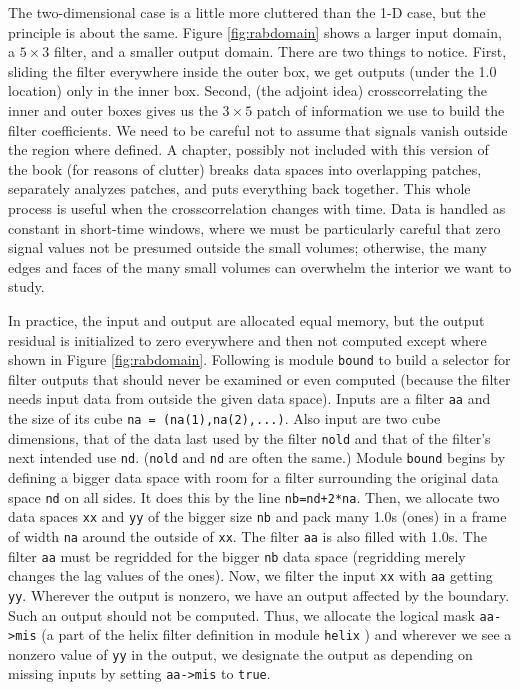 \par
The two-dimensional case is a little more cluttered than the 1-D case,
but the principle is about the same.
Figure \ref{fig:rabdomain} shows a larger input domain,
a $5\times 3$ filter, and a smaller output domain.
There are two things to notice.
First, sliding the filter everywhere inside the outer box,
we get outputs (under the 1.0 location) only in the inner box.
Second, (the adjoint idea) crosscorrelating the inner and outer boxes gives
us the $3\times 5$ patch of information
we use to build the filter coefficients.
We need to be careful not to assume
that signals vanish outside the region where defined.
A chapter, possibly not included with this version of the book
(for reasons of clutter)
breaks data spaces into overlapping patches,
separately analyzes patches, and puts everything back together.
This whole process is useful when the crosscorrelation changes with time.
Data is handled as constant in short-time windows,
where we must be particularly careful that zero signal values not be presumed
outside the small volumes;
otherwise,
the many edges and faces of the many small volumes
can overwhelm the interior we want to study.
\par
In practice, the input and output are allocated equal memory,
but the output residual is initialized to zero everywhere
and then not computed
except where shown in Figure \ref{fig:rabdomain}.
Following is module \texttt{bound}
to build a selector for filter outputs that should 
never be examined or even computed
(because the filter needs input data from outside the given data space).
Inputs are a filter \texttt{aa}
and the size of its cube \texttt{na = (na(1),na(2),...)}.
Also input are two cube dimensions,
that of the data last used by the filter \texttt{nold} and
that of the filter's next intended use \texttt{nd}.
(\texttt{nold} and \texttt{nd} are often the same.)
Module \texttt{bound}
begins by defining a bigger data space with room for a filter
surrounding the original data space \texttt{nd} on all sides.
It does this by the line \texttt{nb=nd+2*na}.
Then, we allocate two data spaces
\texttt{xx} and \texttt{yy} of the bigger size \texttt{nb}
and pack many 1.0s (ones)
in a frame of width \texttt{na} around the outside of \texttt{xx}.
The filter \texttt{aa} is also filled with 1.0s.
The filter \texttt{aa} must be regridded for the bigger \texttt{nb}
data space (regridding merely changes the lag values of the ones).
Now, we filter the input \texttt{xx} with \texttt{aa} getting \texttt{yy}.
Wherever the output is nonzero,
we have an output affected by the boundary.
Such an output should not be computed.
Thus, we allocate the logical mask \verb#aa->mis#
(a part of the helix filter definition
in module \texttt{helix} )
and wherever we see a nonzero value of \texttt{yy}
in the output,
we designate the output as depending on missing inputs by setting
\verb#aa->mis# to \texttt{true}.

